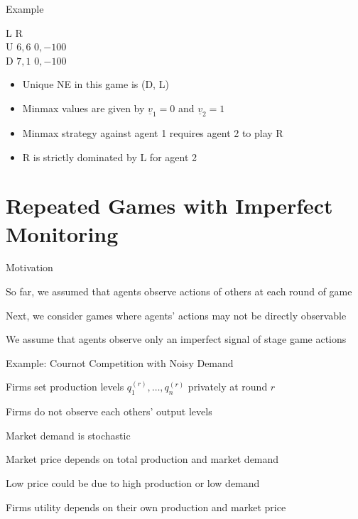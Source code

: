 \documentclass[11pt,aspectratio=169,handout]{beamer}
\begin{document}
  
  \begin{frame}{Example}
   \begin{center}
    \hspace{-0.2em}
    \begin{game}{2}{2}
     	\> L			\> R				\\
     U	\> $6, 6$	\> $ 0, -100$	\\
     D	\> $7, 1$	\> $ 0, -100$
    \end{game}
   \end{center}
   \vspace{1em}
   \begin{itemize}
    \item Unique NE in this game is (D, L)
    \item Minmax values are given by $\underline{v}_{1} = 0 $ and $\underline{v}_{2} = 1 $ 
    \item Minmax strategy against agent 1 requires agent 2 to play R
    \item R is strictly dominated by L for agent 2
   \end{itemize}
  \end{frame}
  
 \section{Repeated Games with Imperfect Monitoring}
 
  \begin{frame}{Motivation}
   \begin{itemizes}[1.5em]
    \item So far, we assumed that agents observe actions of others at each round of game
    \item Next, we consider games where agents' actions may not be directly observable
    \item We assume that agents observe only an \alert{imperfect signal} of stage game actions
   \end{itemizes}
  \end{frame}   
 
  
  \begin{frame}{Example: Cournot Competition with Noisy Demand\\
  \vspace{-0.2cm}{\scriptsize [Green and Porter, Non-cooperative Collusion under Imperfect Price Information, 1984]}}
   \begin{itemizes}
    \item Firms set production levels $q_1^{(r)}, \dots, q_n^{(r)}$ \alert{privately} at round $r$
    \item Firms do not observe each others' output levels
    \item Market demand is \alert{stochastic}
    \item Market price depends on total production and market demand
    \item Low price could be due to high production or low demand
    \item Firms utility depends on their own production and market price
   \end{itemizes}
  \end{frame}
\end{document}
